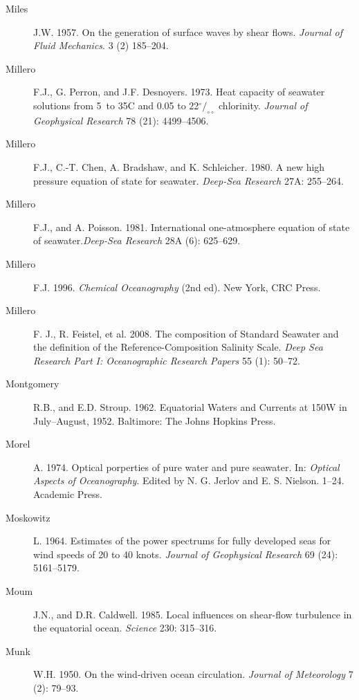 \begin{description}
\item [Miles]J.W. 1957. On the generation of surface waves by shear
  flows.  \textit{Journal of Fluid Mechanics}. 3 (2) 185--204.

\item [Millero]F.J., G. Perron, and J.F. Desnoyers. 1973. Heat
  capacity of seawater solutions from 5\degrees\ to 35\degrees C and
  0.05 to 22$^\circ/_{\circ\circ}$ chlorinity. \textit{Journal of
    Geophysical Research} 78 (21): 4499--4506.

\item[Millero]F.J., C.-T. Chen, A. Bradshaw, and
  K. Schleicher. 1980. A new high pressure equation of state for
  seawater. \textit{Deep-Sea Research} 27A: 255--264.

\item [Millero]F.J., and A. Poisson. 1981. International
  one-atmosphere equation of state of seawater.\textit{Deep-Sea
    Research} 28A (6): 625--629.

\item [Millero]F.J. 1996. \textit{Chemical Oceanography} (2nd ed). New
  York, CRC Press.

\item [Millero]F. J., R. Feistel, et al. 2008. The composition of
  Standard Seawater and the definition of the Reference-Composition
  Salinity Scale. \textit{Deep Sea Research Part I: Oceanographic
    Research Papers} 55 (1): 50--72.

\item [Montgomery]R.B., and E.D. Stroup. 1962. Equatorial Waters and
  Currents at 150\degrees W in July--August, 1952. Baltimore: The
  Johns Hopkins Press.

\item [Morel]A. 1974. Optical porperties of pure water and pure
  seawater. In: \textit{Optical Aspects of Ocean\-ography}. Edited by
  N. G. Jerlov and E. S.  Nielson.  1--24. Academic Press.

\item [Moskowitz]L. 1964. Estimates of the power spectrums for fully
  developed seas for wind speeds of 20 to 40 knots. \textit{Journal of
    Geophysical Research} 69 (24): 5161--5179.

\item [Moum]J.N., and D.R. Caldwell. 1985. Local influences on
  shear-flow turbulence in the equatorial ocean. \textit{Science} 230:
  315--316.

\item [Munk]W.H. 1950. On the wind-driven ocean
  circulation. \textit{Journal of Meteorology} 7 (2): 79--93.


\end{description}
